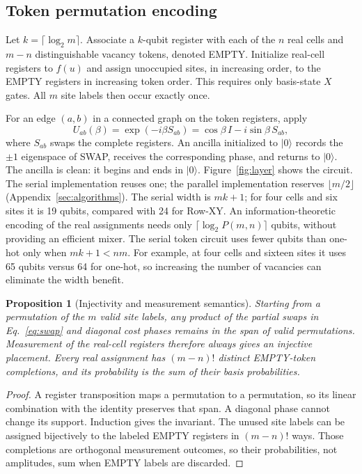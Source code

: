 \documentclass[manuscript,screen,review]{acmart}
\newtheorem{proposition}{Proposition}
\begin{document}
\subsection{Token permutation encoding}
Let $k=\lceil\log_2m\rceil$. Associate a $k$-qubit register with each of the
$n$ real cells and $m-n$ distinguishable vacancy tokens, denoted EMPTY. Initialize real-cell
registers to $f(u)$ and assign unoccupied sites, in increasing order, to the
EMPTY registers in increasing token order. This requires only basis-state
$X$ gates. All $m$ site labels then occur exactly once.

For an edge $(a,b)$ in a connected graph on the token registers, apply
\begin{equation}
 U_{ab}(\beta)=\exp(-i\beta S_{ab})
              =\cos\beta\,I-i\sin\beta\,S_{ab},
 \label{eq:swap}
\end{equation}
where $S_{ab}$ swaps the complete registers. An ancilla initialized to $|0\rangle$ records the
$\pm1$ eigenspace of SWAP, receives the corresponding phase, and returns
to $|0\rangle$. The ancilla is clean: it begins and ends in $|0\rangle$.
Figure~\ref{fig:layer} shows the circuit. The serial implementation reuses one;
the parallel implementation reserves
$\lfloor m/2\rfloor$ (Appendix~\ref{sec:algorithms}).
The serial width is $mk+1$;
for four cells and six sites it is 19 qubits, compared with 24 for Row-XY.
An information-theoretic encoding of the real assignments needs only
$\lceil\log_2 P(m,n)\rceil$ qubits, without providing an efficient mixer.
The serial token circuit uses fewer qubits than one-hot only when $mk+1<nm$. For example, at four cells
and sixteen sites it uses 65 qubits versus 64 for one-hot, so increasing the
number of vacancies can eliminate the width benefit.

\begin{proposition}[Injectivity and measurement semantics]
Starting from a permutation of the $m$ valid site labels, any product of the
partial swaps in Eq.~\eqref{eq:swap} and diagonal cost phases remains in the
span of valid permutations. Measurement of the real-cell registers therefore
always gives an injective placement. Every real assignment has $(m-n)!$
distinct EMPTY-token completions, and its probability is the sum of their
basis probabilities.
\end{proposition}
\begin{proof}
A register transposition maps a permutation to a permutation, so its linear
combination with the identity preserves that span. A diagonal phase cannot
change its support. Induction gives the invariant. The unused site labels can
be assigned bijectively to the labeled EMPTY registers in $(m-n)!$ ways.
Those completions are orthogonal measurement outcomes, so their probabilities,
not amplitudes, sum when EMPTY labels are discarded.
\end{proof}
\end{document}
